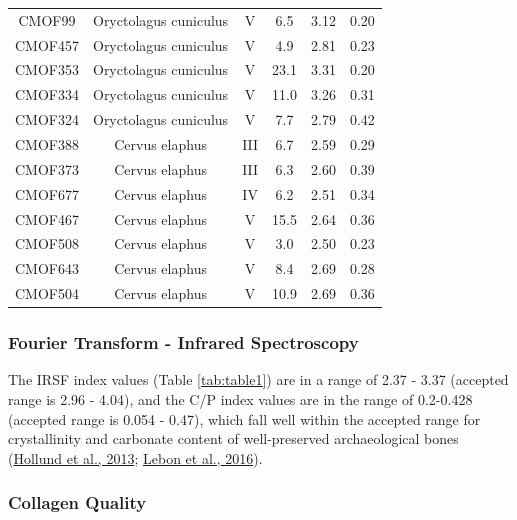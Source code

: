\documentclass[3p]{elsarticle} %
\begin{document}
\begin{longtable}[t]{cccccc}
CMOF99 & Oryctolagus cuniculus & V & 6.5 & 3.12 & 0.20\\
CMOF457 & Oryctolagus cuniculus & V & 4.9 & 2.81 & 0.23\\
CMOF353 & Oryctolagus cuniculus & V & 23.1 & 3.31 & 0.20\\
CMOF334 & Oryctolagus cuniculus & V & 11.0 & 3.26 & 0.31\\
CMOF324 & Oryctolagus cuniculus & V & 7.7 & 2.79 & 0.42\\
CMOF388 & Cervus elaphus & III & 6.7 & 2.59 & 0.29\\
CMOF373 & Cervus elaphus & III & 6.3 & 2.60 & 0.39\\
CMOF677 & Cervus elaphus & IV & 6.2 & 2.51 & 0.34\\
CMOF467 & Cervus elaphus & V & 15.5 & 2.64 & 0.36\\
CMOF508 & Cervus elaphus & V & 3.0 & 2.50 & 0.23\\
CMOF643 & Cervus elaphus & V & 8.4 & 2.69 & 0.28\\
CMOF504 & Cervus elaphus & V & 10.9 & 2.69 & 0.36\\*
\end{longtable}
\endgroup{}

\hypertarget{fourier-transform---infrared-spectroscopy}{%
\subsubsection{Fourier Transform - Infrared Spectroscopy}\label{fourier-transform---infrared-spectroscopy}}

The IRSF index values (Table \ref{tab:table1}) are in a range of 2.37 - 3.37 (accepted range is 2.96 - 4.04), and the C/P index values are in the range of 0.2-0.428 (accepted range is 0.054 - 0.47), which fall well within the accepted range for crystallinity and carbonate content of well-preserved archaeological bones (\protect\hyperlink{ref-hollund_etal13}{Hollund et al., 2013}; \protect\hyperlink{ref-lebon_etal16}{Lebon et al., 2016}).

\hypertarget{collagen-quality}{%
\subsubsection{Collagen Quality}\label{collagen-quality}}
\end{document}
